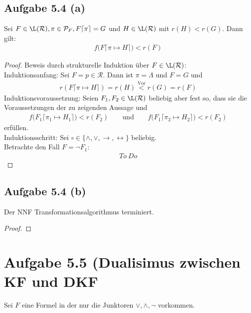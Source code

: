 \documentclass[12pt,a4paper]{article}
\newcommand{\RR}{\mathcal{R}}
\newcommand{\PP}{\mathcal{P}}
\begin{document}
\subsection*{Aufgabe 5.4 (a)}
Sei $F\in\L(\RR),\pi\in\PP_F,F\lceil\pi\rceil=G$ und $H\in\L(\RR)$ mit $r(H)<r(G)$. Dann gilt:
\begin{align*}
f\big(F\lceil\pi\mapsto H\rceil\big)<r(F)
\end{align*}
\begin{proof}
Beweis durch strukturelle Induktion über $F\in\L(\RR)$:\\
Induktionsanfang: Sei $F=p\in\RR$. Dann ist $\pi=\Lambda$ und $F=G$ und
\begin{align*}
r(F\lceil\pi\mapsto H\rceil)=r(H)\stackrel{\text{Vor}}{<}r(G)=r(F)
\end{align*}
Induktionsvoraussetzung: Seien $F_1,F_2\in\L(\RR)$ beliebig aber fest so, dass sie die Voraussetzungen der zu zeigenden Aussage und
\begin{align*}
f\big(F_1\lceil\pi_1\mapsto H_1\rceil\big)<r(F_2)
\qquad\text{und}\qquad
f\big(F_1\lceil\pi_2\mapsto H_2\rceil\big)<r(F_2)
\end{align*}
erfüllen.\\

Induktionsschritt: Sei $\circ\in\lbrace\wedge,\vee,\to,\leftrightarrow\rbrace$ beliebig.\\
Betrachte den Fall $F=\neg F_1$:
\begin{align*}
To~Do
\end{align*}
\end{proof}

\subsection*{Aufgabe 5.4 (b)}
Der NNF Transformationsalgorithmus terminiert.
\begin{proof}

\end{proof}

\section*{Aufgabe 5.5 (Dualisimus zwischen KF und DKF}
Sei $F$ eine Formel in der nur die Junktoren $\vee,\wedge,\neg$ vorkommen.
\end{document}
